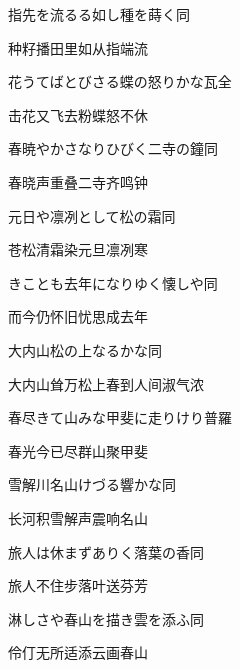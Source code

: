 \begin{haiku}
    {\FH 指先を流るる如し種を蒔く}\hfill{\FH 同}

    {\FK 种籽播田里如从指端流}
\end{haiku}

\begin{haiku}
    {\FH 花うてばとびさる蝶の怒りかな}\hfill{\FH 瓦全}

    {\FK 击花又飞去粉蝶怒不休}
\end{haiku}

\begin{haiku}
    {\FH 春暁やかさなりひびく二寺の鐘}\hfill{\FH 同}

    {\FK 春晓声重叠二寺齐鸣钟}
\end{haiku}

\begin{haiku}
    {\FH 元日や凛冽として松の霜}\hfill{\FH 同}

    {\FK 苍松清霜染元旦凛冽寒}
\end{haiku}

\begin{haiku}
    {\FH {}きことも去年になりゆく懐しや}\hfill{\FH 同}

    {\FK 而今仍怀旧忧思成去年}
\end{haiku}

\begin{haiku}
    {\FH 大内山松の上なるかな}\hfill{\FH 同}

    {\FK 大内山耸万松上春到人间淑气浓}
\end{haiku}

\begin{haiku}
    {\FH 春尽きて山みな甲斐に走りけり}\hfill{\FH 普羅}

    {\FK 春光今已尽群山聚甲斐}
\end{haiku}

\begin{haiku}
    {\FH 雪解川名山けづる響かな}\hfill{\FH 同}

    {\FK 长河积雪解声震响名山}
\end{haiku}

\begin{haiku}
    {\FH 旅人は休まずありく落葉の香}\hfill{\FH 同}

    {\FK 旅人不住步落叶送芬芳}
\end{haiku}

\begin{haiku}
    {\FH 淋しさや春山を描き雲を添ふ}\hfill{\FH 同}

    {\FK 伶仃无所适添云画春山}
\end{haiku}

